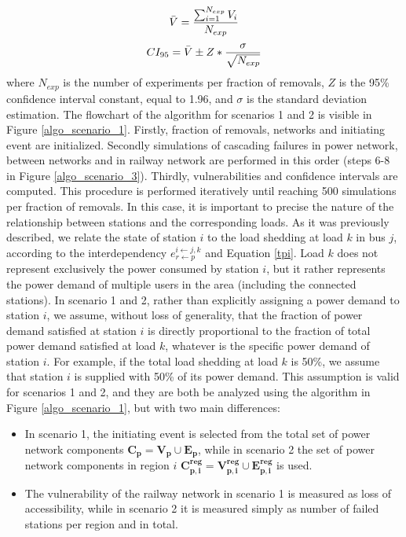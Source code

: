 \documentclass[review]{elsarticle}
\begin{document}
\begin{equation}
    \Bar{V} = \frac{\sum_{i=1}^{N_{exp}} V_i}{N_{exp}}   
\label{average_mc}
\end{equation}
\begin{equation}
    CI_{95} = \Bar{V} \pm Z*\frac{\sigma}{\sqrt{N_{exp}}} 
    \label{ci95}
\end{equation}
	where $N_{exp}$ is the number of experiments per fraction of removals, $Z$ is the 95\% confidence interval constant, equal to 1.96, and $\sigma$ is the standard deviation estimation.
	The flowchart of the algorithm for scenarios 1 and 2 is visible in Figure \ref{algo_scenario_1}. Firstly, fraction of removals, networks and initiating event are initialized. Secondly simulations of cascading failures in power network, between networks and in railway network are performed in this order (steps 6-8 in Figure \ref{algo_scenario_3}). Thirdly, vulnerabilities and confidence intervals are computed. This procedure is performed iteratively until reaching 500 simulations per fraction of removals. In this case, it is important to precise the nature of the relationship between stations and the corresponding loads. As it was previously described, we relate the state of station $i$ to the load shedding at load $k$ in bus $j$, according to the interdependency $e^{i \leftarrow j,k}_{r\leftarrow p}$ and Equation \ref{tpi}. Load $k$ does not represent exclusively the power consumed by station $i$, but it rather represents the power demand of multiple users in the area (including the connected stations). In scenario 1 and 2, rather than explicitly assigning a power demand to station $i$, we assume, without loss of generality, that the fraction of power demand satisfied at station $i$ is directly proportional to the fraction of total power demand satisfied at load $k$, whatever is the specific power demand of station $i$. For example, if the total load shedding at load $k$ is 50\%, we assume that station $i$ is supplied with 50\% of its power demand. This assumption is valid for scenarios 1 and 2, and they are both be analyzed using the algorithm in Figure \ref{algo_scenario_1}, but with two main differences:
    \begin{itemize}
        \item In scenario 1, the initiating event is selected from the total set of power network components $\mathbf{C_p} = \mathbf{V_p} \displaystyle \cup \mathbf{E_p}$, while in scenario 2 the set of power network components in region $i$ $\mathbf{C^{reg}_{p,i}} = \mathbf{V^{reg}_{p,i}} \displaystyle \cup \mathbf{E^{reg}_{p,i}}$ is used.
        \item The vulnerability of the railway network in scenario 1 is measured as loss of accessibility, while in scenario 2 it is measured simply as number of failed stations per region and in total. 
    \end{itemize}
\end{document}
